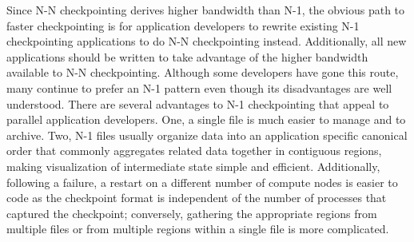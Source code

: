 Since N-N checkpointing derives higher bandwidth than N-1, the obvious path to
faster checkpointing is for application developers to rewrite existing N-1
checkpointing applications to do N-N checkpointing instead.  Additionally, all
new applications should be written to take advantage of the higher bandwidth
available to N-N checkpointing.  Although some developers have gone this route,
many continue to prefer an N-1 pattern even though its disadvantages are well
understood.  There are several advantages to N-1 checkpointing that appeal to
parallel application developers.  One, a single file is much easier to manage
and to archive.  Two, N-1 files usually organize data into an application
specific canonical order that commonly aggregates related data together in
contiguous regions, making visualization of intermediate state simple and
efficient.  Additionally, following a failure, a restart on a different number
of compute nodes is easier to code as the checkpoint format is independent of
the number of processes that captured the checkpoint; conversely, gathering the
appropriate regions from multiple files or from multiple regions within a
single file is more complicated.  




